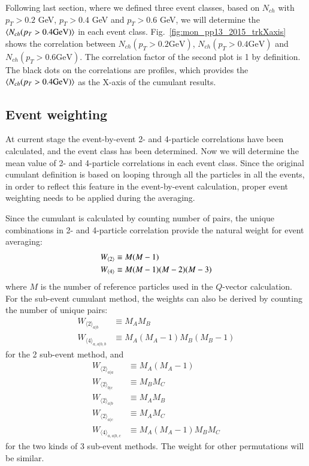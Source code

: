Following last section, where we defined three event classes, based on $N_{ch}$ with $p_{T}>0.2$ GeV, $p_{T}>0.4$ GeV and $p_{T}>0.6$ GeV, we will determine the $\left\langle N_{ch} (p_{T}>0.4 \text{GeV})\right\rangle$ in each event class. Fig.~\ref{fig:mon_pp13_2015_trkXaxis} shows the correlation between $N_{ch} (p_{T}>0.2 \text{GeV})$, $N_{ch} (p_{T}>0.4 \text{GeV})$ and $N_{ch} (p_{T}>0.6 \text{GeV})$. The correlation factor of the second plot is 1 by definition. The black dots on the correlations are profiles, which provides the $\left\langle N_{ch} (p_{T}>0.4 \text{GeV})\right\rangle$ as the X-axis of the cumulant results.

\subsection{Event weighting}
At current stage the event-by-event 2- and 4-particle correlations have been calculated, and the event class has been determined. Now we will determine the mean value of 2- and 4-particle correlations in each event class. Since the original cumulant definition is based on looping through all the particles in all the events, in order to reflect this feature in the event-by-event calculation, proper event weighting needs to be applied during the averaging.

Since the cumulant is calculated by counting number of pairs, the unique combinations in 2- and 4-particle correlation provide the natural weight for event averaging:
\begin{equation}
\begin{split}
W_{\left\langle 2\right\rangle}&\equiv M(M-1) \\
W_{\left\langle 4\right\rangle}&\equiv M(M-1)(M-2)(M-3)
\end{split}
\end{equation}
where $M$ is the number of reference particles used in the $Q$-vector calculation. For the sub-event cumulant method, the weights can also be derived by counting the number of unique pairs:
\begin{equation}
\begin{split}
W_{\langle2\rangle_{a|b}}&\equiv M_{A}M_{B} \\
W_{\langle4\rangle_{a,a|b,b}}&\equiv M_{A}(M_{A}-1)M_{B}(M_{B}-1)
\end{split}
\end{equation}
for the 2 sub-event method, and
\begin{equation}
\begin{split}
W_{\langle2\rangle_{a|a}}&\equiv M_{A}(M_{A}-1) \\
W_{\langle2\rangle_{b|c}}&\equiv M_{B}M_{C} \\
W_{\langle2\rangle_{a|b}}&\equiv M_{A}M_{B} \\
W_{\langle2\rangle_{a|c}}&\equiv M_{A}M_{C} \\
W_{\langle4\rangle_{a,a|b,c}}&\equiv M_{A}(M_{A}-1)M_{B}M_{C}
\end{split}
\end{equation}
for the two kinds of 3 sub-event methods. The weight for other permutations will be similar.

